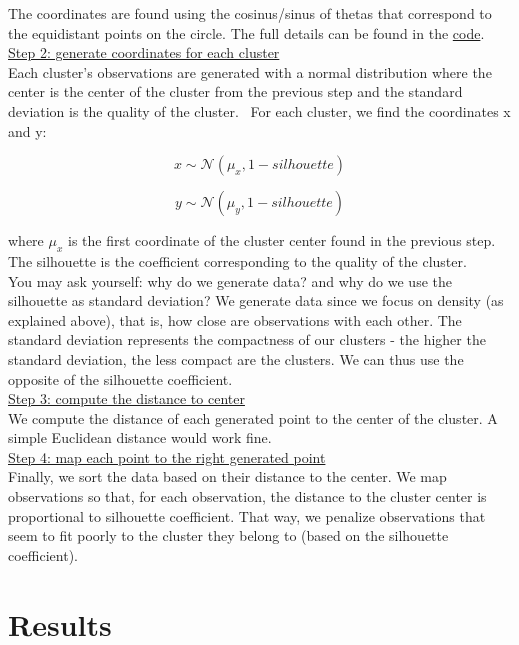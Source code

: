 The coordinates are found using the cosinus/sinus of thetas that correspond to the equidistant points on the circle. The full details can be found in the \href{https://github.com/savoga/clustering-visualization-article/blob/main/clustering-visualization-article.ipynb}{code}. \\

\underline{Step 2: generate coordinates for each cluster} \\

Each cluster's observations are generated with a normal distribution where the center is the center of the cluster from the previous step and the standard deviation is the quality of the cluster. 
For each cluster, we find the coordinates x and y:

$$x \sim \mathcal{N}(\mu_x, 1-silhouette)$$

$$y \sim \mathcal{N}(\mu_y, 1-silhouette)$$

where $\mu_x$ is the first coordinate of the cluster center found in the previous step. The silhouette is the coefficient corresponding to the quality of the cluster. \\

You may ask yourself: why do we generate data? and why do we use the silhouette as standard deviation? We generate data since we focus on density (as explained above), that is, how close are observations with each other. The standard deviation represents the compactness of our clusters - the higher the standard deviation, the less compact are the clusters. We can thus use the opposite of the silhouette coefficient. \\

\underline{Step 3: compute the distance to center} \\

We compute the distance of each generated point to the center of the cluster. A simple Euclidean distance would work fine. \\

\underline{Step 4: map each point to the right generated point} \\

Finally, we sort the data based on their distance to the center. We map observations so that, for each observation, the distance to the cluster center is proportional to silhouette coefficient. That way, we penalize observations that seem to fit poorly to the cluster they belong to (based on the silhouette coefficient).

\section{Results}

